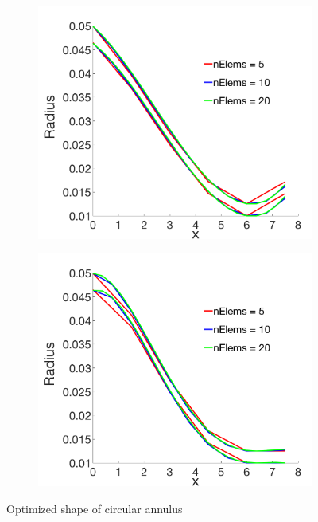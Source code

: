 \documentclass[a4paper]{article}
\begin{document}
\begin{figure} [H]
  \begin{subfigure}{0.51\textwidth}
    \centering
    \includegraphics[width=1.0\linewidth]{p3.png}
    \label{fig:cubic}
  \end{subfigure}
  \begin{subfigure}{0.51\textwidth}
    \centering
    \includegraphics[width=1.0\linewidth]{p4.png}
    \label{fig:quatic}
  \end{subfigure}  
  \caption{Optimized shape of circular annulus  \label{fig:final_shape}}
\end{figure}
\end{document}
